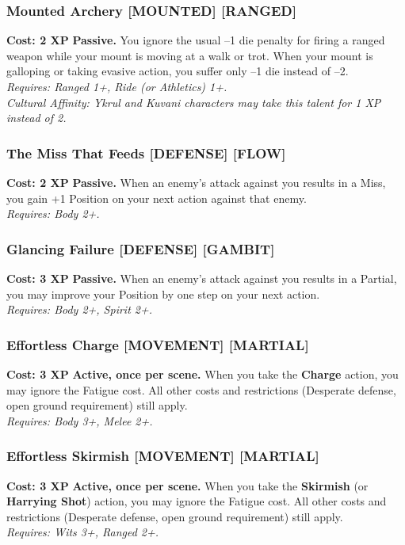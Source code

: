 \documentclass[12pt,a4paper]{book}
\begin{document}
\subsubsection*{Mounted Archery \textnormal{[MOUNTED] [RANGED]}}
\label{talent:mounted-archery}
\textbf{Cost: 2 XP} \textbf{Passive.} You ignore the usual --1 die penalty for firing a ranged weapon while your mount is moving at a walk or trot. When your mount is galloping or taking evasive action, you suffer only --1 die instead of --2. \\
\textit{Requires: Ranged 1+, Ride (or Athletics) 1+.} \\
\textit{Cultural Affinity: Ykrul and Kuvani characters may take this talent for 1 XP instead of 2.}

\subsubsection*{The Miss That Feeds \textnormal{[DEFENSE] [FLOW]}}
\label{talent:miss-that-feeds}
\textbf{Cost: 2 XP} \textbf{Passive.}
When an enemy's attack against you results in a Miss, you gain +1 Position on your next action against that enemy. \\
\textit{Requires: Body 2+.}

\subsubsection*{Glancing Failure \textnormal{[DEFENSE] [GAMBIT]}}
\label{talent:glancing-failure}
\textbf{Cost: 3 XP} \textbf{Passive.}
When an enemy's attack against you results in a Partial, you may improve your Position by one step on your next action. \\
\textit{Requires: Body 2+, Spirit 2+.}

\subsubsection*{Effortless Charge \textnormal{[MOVEMENT] [MARTIAL]}}
\label{talent:effortless-charge}
\textbf{Cost: 3 XP} \textbf{Active, once per scene.} When you take the \textbf{Charge} action, you may ignore the Fatigue cost. All other costs and restrictions (Desperate defense, open ground requirement) still apply. \\
\textit{Requires: Body 3+, Melee 2+.}

\subsubsection*{Effortless Skirmish \textnormal{[MOVEMENT] [MARTIAL]}}
\label{talent:effortless-skirmish}
\textbf{Cost: 3 XP} \textbf{Active, once per scene.} When you take the \textbf{Skirmish} (or \textbf{Harrying Shot}) action, you may ignore the Fatigue cost. All other costs and restrictions (Desperate defense, open ground requirement) still apply. \\
\textit{Requires: Wits 3+, Ranged 2+.}
\end{document}
